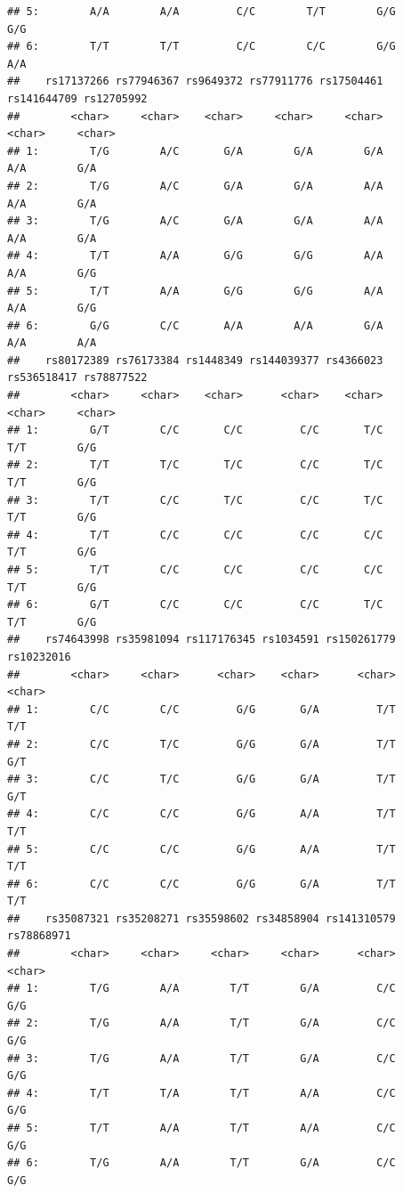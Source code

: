 \documentclass[
]{article}
\begin{document}
\begin{verbatim}
## 5:        A/A        A/A         C/C        T/T        G/G        G/G
## 6:        T/T        T/T         C/C        C/C        G/G        A/A
##    rs17137266 rs77946367 rs9649372 rs77911776 rs17504461 rs141644709 rs12705992
##        <char>     <char>    <char>     <char>     <char>      <char>     <char>
## 1:        T/G        A/C       G/A        G/A        G/A         A/A        G/A
## 2:        T/G        A/C       G/A        G/A        A/A         A/A        G/A
## 3:        T/G        A/C       G/A        G/A        A/A         A/A        G/A
## 4:        T/T        A/A       G/G        G/G        A/A         A/A        G/G
## 5:        T/T        A/A       G/G        G/G        A/A         A/A        G/G
## 6:        G/G        C/C       A/A        A/A        G/A         A/A        A/A
##    rs80172389 rs76173384 rs1448349 rs144039377 rs4366023 rs536518417 rs78877522
##        <char>     <char>    <char>      <char>    <char>      <char>     <char>
## 1:        G/T        C/C       C/C         C/C       T/C         T/T        G/G
## 2:        T/T        T/C       T/C         C/C       T/C         T/T        G/G
## 3:        T/T        C/C       T/C         C/C       T/C         T/T        G/G
## 4:        T/T        C/C       C/C         C/C       C/C         T/T        G/G
## 5:        T/T        C/C       C/C         C/C       C/C         T/T        G/G
## 6:        G/T        C/C       C/C         C/C       T/C         T/T        G/G
##    rs74643998 rs35981094 rs117176345 rs1034591 rs150261779 rs10232016
##        <char>     <char>      <char>    <char>      <char>     <char>
## 1:        C/C        C/C         G/G       G/A         T/T        T/T
## 2:        C/C        T/C         G/G       G/A         T/T        G/T
## 3:        C/C        T/C         G/G       G/A         T/T        G/T
## 4:        C/C        C/C         G/G       A/A         T/T        T/T
## 5:        C/C        C/C         G/G       A/A         T/T        T/T
## 6:        C/C        C/C         G/G       G/A         T/T        T/T
##    rs35087321 rs35208271 rs35598602 rs34858904 rs141310579 rs78868971
##        <char>     <char>     <char>     <char>      <char>     <char>
## 1:        T/G        A/A        T/T        G/A         C/C        G/G
## 2:        T/G        A/A        T/T        G/A         C/C        G/G
## 3:        T/G        A/A        T/T        G/A         C/C        G/G
## 4:        T/T        T/A        T/T        A/A         C/C        G/G
## 5:        T/T        A/A        T/T        A/A         C/C        G/G
## 6:        T/G        A/A        T/T        G/A         C/C        G/G

\end{verbatim}
\end{document}

